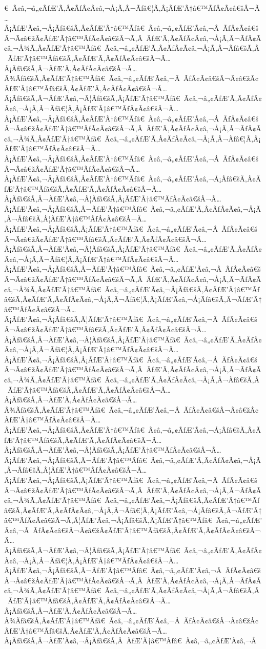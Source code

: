 \documentclass{article}
\begin{document}
\begin{outline}[enumerate]
€ Ã¢â‚¬â„¢ÃƒÆ’Ã‚Â¢ÃƒÂ¢Ã¢â‚¬Å¡Ã‚Â¬Ãƒâ€¦Ã‚Â¡ÃƒÆ’Ã†â€™ÃƒÂ¢Ã¢â€šÂ¬Ã…Â¡ÃƒÆ’Ã¢â‚¬Å¡Ãƒâ€šÃ‚Â¢ÃƒÆ’Ã†â€™Ãƒâ€ Ã¢â‚¬â„¢ÃƒÆ’Ã¢â‚¬Â ÃƒÂ¢Ã¢â€šÂ¬Ã¢â€žÂ¢ÃƒÆ’Ã†â€™ÃƒÂ¢Ã¢â€šÂ¬Ã‚Â ÃƒÆ’Ã‚Â¢ÃƒÂ¢Ã¢â‚¬Å¡Ã‚Â¬ÃƒÂ¢Ã¢â‚¬Å¾Ã‚Â¢ÃƒÆ’Ã†â€™Ãƒâ€ Ã¢â‚¬â„¢ÃƒÆ’Ã‚Â¢ÃƒÂ¢Ã¢â‚¬Å¡Ã‚Â¬Ãƒâ€šÃ‚Â ÃƒÆ’Ã†â€™Ãƒâ€šÃ‚Â¢ÃƒÆ’Ã‚Â¢ÃƒÂ¢Ã¢â€šÂ¬Ã…Â¡Ãƒâ€šÃ‚Â¬ÃƒÆ’Ã‚Â¢ÃƒÂ¢Ã¢â€šÂ¬Ã…Â¾Ãƒâ€šÃ‚Â¢ÃƒÆ’Ã†â€™Ãƒâ€ Ã¢â‚¬â„¢ÃƒÆ’Ã¢â‚¬Â ÃƒÂ¢Ã¢â€šÂ¬Ã¢â€žÂ¢ÃƒÆ’Ã†â€™Ãƒâ€šÃ‚Â¢ÃƒÆ’Ã‚Â¢ÃƒÂ¢Ã¢â€šÂ¬Ã…Â¡Ãƒâ€šÃ‚Â¬ÃƒÆ’Ã¢â‚¬Â¦Ãƒâ€šÃ‚Â¡ÃƒÆ’Ã†â€™Ãƒâ€ Ã¢â‚¬â„¢ÃƒÆ’Ã‚Â¢ÃƒÂ¢Ã¢â‚¬Å¡Ã‚Â¬Ãƒâ€¦Ã‚Â¡ÃƒÆ’Ã†â€™ÃƒÂ¢Ã¢â€šÂ¬Ã…Â¡ÃƒÆ’Ã¢â‚¬Å¡Ãƒâ€šÃ‚Â¢ÃƒÆ’Ã†â€™Ãƒâ€ Ã¢â‚¬â„¢ÃƒÆ’Ã¢â‚¬Â ÃƒÂ¢Ã¢â€šÂ¬Ã¢â€žÂ¢ÃƒÆ’Ã†â€™ÃƒÂ¢Ã¢â€šÂ¬Ã‚Â ÃƒÆ’Ã‚Â¢ÃƒÂ¢Ã¢â‚¬Å¡Ã‚Â¬ÃƒÂ¢Ã¢â‚¬Å¾Ã‚Â¢ÃƒÆ’Ã†â€™Ãƒâ€ Ã¢â‚¬â„¢ÃƒÆ’Ã‚Â¢ÃƒÂ¢Ã¢â‚¬Å¡Ã‚Â¬Ãƒâ€¦Ã‚Â¡ÃƒÆ’Ã†â€™ÃƒÂ¢Ã¢â€šÂ¬Ã…Â¡ÃƒÆ’Ã¢â‚¬Å¡Ãƒâ€šÃ‚Â¢ÃƒÆ’Ã†â€™Ãƒâ€ Ã¢â‚¬â„¢ÃƒÆ’Ã¢â‚¬Â ÃƒÂ¢Ã¢â€šÂ¬Ã¢â€žÂ¢ÃƒÆ’Ã†â€™ÃƒÂ¢Ã¢â€šÂ¬Ã…Â¡ÃƒÆ’Ã¢â‚¬Å¡Ãƒâ€šÃ‚Â¢ÃƒÆ’Ã†â€™Ãƒâ€ Ã¢â‚¬â„¢ÃƒÆ’Ã¢â‚¬Å¡Ãƒâ€šÃ‚Â¢ÃƒÆ’Ã†â€™Ãƒâ€šÃ‚Â¢ÃƒÆ’Ã‚Â¢ÃƒÂ¢Ã¢â€šÂ¬Ã…Â¡Ãƒâ€šÃ‚Â¬ÃƒÆ’Ã¢â‚¬Â¦Ãƒâ€šÃ‚Â¡ÃƒÆ’Ã†â€™ÃƒÂ¢Ã¢â€šÂ¬Ã…Â¡ÃƒÆ’Ã¢â‚¬Å¡Ãƒâ€šÃ‚Â¬ÃƒÆ’Ã†â€™Ãƒâ€ Ã¢â‚¬â„¢ÃƒÆ’Ã‚Â¢ÃƒÂ¢Ã¢â‚¬Å¡Ã‚Â¬Ãƒâ€šÃ‚Â¦ÃƒÆ’Ã†â€™ÃƒÂ¢Ã¢â€šÂ¬Ã…Â¡ÃƒÆ’Ã¢â‚¬Å¡Ãƒâ€šÃ‚Â¡ÃƒÆ’Ã†â€™Ãƒâ€ Ã¢â‚¬â„¢ÃƒÆ’Ã¢â‚¬Â ÃƒÂ¢Ã¢â€šÂ¬Ã¢â€žÂ¢ÃƒÆ’Ã†â€™Ãƒâ€šÃ‚Â¢ÃƒÆ’Ã‚Â¢ÃƒÂ¢Ã¢â€šÂ¬Ã…Â¡Ãƒâ€šÃ‚Â¬ÃƒÆ’Ã¢â‚¬Â¦Ãƒâ€šÃ‚Â¡ÃƒÆ’Ã†â€™Ãƒâ€ Ã¢â‚¬â„¢ÃƒÆ’Ã‚Â¢ÃƒÂ¢Ã¢â‚¬Å¡Ã‚Â¬Ãƒâ€¦Ã‚Â¡ÃƒÆ’Ã†â€™ÃƒÂ¢Ã¢â€šÂ¬Ã…Â¡ÃƒÆ’Ã¢â‚¬Å¡Ãƒâ€šÃ‚Â¬ÃƒÆ’Ã†â€™Ãƒâ€ Ã¢â‚¬â„¢ÃƒÆ’Ã¢â‚¬Â ÃƒÂ¢Ã¢â€šÂ¬Ã¢â€žÂ¢ÃƒÆ’Ã†â€™ÃƒÂ¢Ã¢â€šÂ¬Ã‚Â ÃƒÆ’Ã‚Â¢ÃƒÂ¢Ã¢â‚¬Å¡Ã‚Â¬ÃƒÂ¢Ã¢â‚¬Å¾Ã‚Â¢ÃƒÆ’Ã†â€™Ãƒâ€ Ã¢â‚¬â„¢ÃƒÆ’Ã¢â‚¬Å¡Ãƒâ€šÃ‚Â¢ÃƒÆ’Ã†â€™Ãƒâ€šÃ‚Â¢ÃƒÆ’Ã‚Â¢ÃƒÂ¢Ã¢â‚¬Å¡Ã‚Â¬Ãƒâ€¦Ã‚Â¡ÃƒÆ’Ã¢â‚¬Å¡Ãƒâ€šÃ‚Â¬ÃƒÆ’Ã†â€™ÃƒÂ¢Ã¢â€šÂ¬Ã…Â¡ÃƒÆ’Ã¢â‚¬Å¡Ãƒâ€šÃ‚Â¦ÃƒÆ’Ã†â€™Ãƒâ€ Ã¢â‚¬â„¢ÃƒÆ’Ã¢â‚¬Â ÃƒÂ¢Ã¢â€šÂ¬Ã¢â€žÂ¢ÃƒÆ’Ã†â€™Ãƒâ€šÃ‚Â¢ÃƒÆ’Ã‚Â¢ÃƒÂ¢Ã¢â€šÂ¬Ã…Â¡Ãƒâ€šÃ‚Â¬ÃƒÆ’Ã¢â‚¬Â¦Ãƒâ€šÃ‚Â¡ÃƒÆ’Ã†â€™Ãƒâ€ Ã¢â‚¬â„¢ÃƒÆ’Ã‚Â¢ÃƒÂ¢Ã¢â‚¬Å¡Ã‚Â¬Ãƒâ€¦Ã‚Â¡ÃƒÆ’Ã†â€™ÃƒÂ¢Ã¢â€šÂ¬Ã…Â¡ÃƒÆ’Ã¢â‚¬Å¡Ãƒâ€šÃ‚Â¡ÃƒÆ’Ã†â€™Ãƒâ€ Ã¢â‚¬â„¢ÃƒÆ’Ã¢â‚¬Â ÃƒÂ¢Ã¢â€šÂ¬Ã¢â€žÂ¢ÃƒÆ’Ã†â€™ÃƒÂ¢Ã¢â€šÂ¬Ã‚Â ÃƒÆ’Ã‚Â¢ÃƒÂ¢Ã¢â‚¬Å¡Ã‚Â¬ÃƒÂ¢Ã¢â‚¬Å¾Ã‚Â¢ÃƒÆ’Ã†â€™Ãƒâ€ Ã¢â‚¬â„¢ÃƒÆ’Ã‚Â¢ÃƒÂ¢Ã¢â‚¬Å¡Ã‚Â¬Ãƒâ€šÃ‚Â ÃƒÆ’Ã†â€™Ãƒâ€šÃ‚Â¢ÃƒÆ’Ã‚Â¢ÃƒÂ¢Ã¢â€šÂ¬Ã…Â¡Ãƒâ€šÃ‚Â¬ÃƒÆ’Ã‚Â¢ÃƒÂ¢Ã¢â€šÂ¬Ã…Â¾Ãƒâ€šÃ‚Â¢ÃƒÆ’Ã†â€™Ãƒâ€ Ã¢â‚¬â„¢ÃƒÆ’Ã¢â‚¬Â ÃƒÂ¢Ã¢â€šÂ¬Ã¢â€žÂ¢ÃƒÆ’Ã†â€™ÃƒÂ¢Ã¢â€šÂ¬Ã…Â¡ÃƒÆ’Ã¢â‚¬Å¡Ãƒâ€šÃ‚Â¢ÃƒÆ’Ã†â€™Ãƒâ€ Ã¢â‚¬â„¢ÃƒÆ’Ã¢â‚¬Å¡Ãƒâ€šÃ‚Â¢ÃƒÆ’Ã†â€™Ãƒâ€šÃ‚Â¢ÃƒÆ’Ã‚Â¢ÃƒÂ¢Ã¢â€šÂ¬Ã…Â¡Ãƒâ€šÃ‚Â¬ÃƒÆ’Ã¢â‚¬Â¦Ãƒâ€šÃ‚Â¡ÃƒÆ’Ã†â€™ÃƒÂ¢Ã¢â€šÂ¬Ã…Â¡ÃƒÆ’Ã¢â‚¬Å¡Ãƒâ€šÃ‚Â¬ÃƒÆ’Ã†â€™Ãƒâ€ Ã¢â‚¬â„¢ÃƒÆ’Ã‚Â¢ÃƒÂ¢Ã¢â‚¬Å¡Ã‚Â¬Ãƒâ€šÃ‚Â¦ÃƒÆ’Ã†â€™ÃƒÂ¢Ã¢â€šÂ¬Ã…Â¡ÃƒÆ’Ã¢â‚¬Å¡Ãƒâ€šÃ‚Â¡ÃƒÆ’Ã†â€™Ãƒâ€ Ã¢â‚¬â„¢ÃƒÆ’Ã¢â‚¬Â ÃƒÂ¢Ã¢â€šÂ¬Ã¢â€žÂ¢ÃƒÆ’Ã†â€™ÃƒÂ¢Ã¢â€šÂ¬Ã‚Â ÃƒÆ’Ã‚Â¢ÃƒÂ¢Ã¢â‚¬Å¡Ã‚Â¬ÃƒÂ¢Ã¢â‚¬Å¾Ã‚Â¢ÃƒÆ’Ã†â€™Ãƒâ€ Ã¢â‚¬â„¢ÃƒÆ’Ã¢â‚¬Å¡Ãƒâ€šÃ‚Â¢ÃƒÆ’Ã†â€™Ãƒâ€šÃ‚Â¢ÃƒÆ’Ã‚Â¢ÃƒÂ¢Ã¢â‚¬Å¡Ã‚Â¬Ãƒâ€¦Ã‚Â¡ÃƒÆ’Ã¢â‚¬Å¡Ãƒâ€šÃ‚Â¬ÃƒÆ’Ã†â€™ÃƒÂ¢Ã¢â€šÂ¬Ã‚Â¦ÃƒÆ’Ã¢â‚¬Å¡Ãƒâ€šÃ‚Â¡ÃƒÆ’Ã†â€™Ãƒâ€ Ã¢â‚¬â„¢ÃƒÆ’Ã¢â‚¬Â ÃƒÂ¢Ã¢â€šÂ¬Ã¢â€žÂ¢ÃƒÆ’Ã†â€™Ãƒâ€šÃ‚Â¢ÃƒÆ’Ã‚Â¢ÃƒÂ¢Ã¢â€šÂ¬Ã…Â¡Ãƒâ€šÃ‚Â¬ÃƒÆ’Ã¢â‚¬Â¦Ãƒâ€šÃ‚Â¡ÃƒÆ’Ã†â€™Ãƒâ€ Ã¢â‚¬â„¢ÃƒÆ’Ã‚Â¢ÃƒÂ¢Ã¢â‚¬Å¡Ã‚Â¬Ãƒâ€¦Ã‚Â¡ÃƒÆ’Ã†â€™ÃƒÂ¢Ã¢â€šÂ¬Ã…Â¡ÃƒÆ’Ã¢â‚¬Å¡Ãƒâ€šÃ‚Â¬ÃƒÆ’Ã†â€™Ãƒâ€ Ã¢â‚¬â„¢ÃƒÆ’Ã¢â‚¬Â ÃƒÂ¢Ã¢â€šÂ¬Ã¢â€žÂ¢ÃƒÆ’Ã†â€™ÃƒÂ¢Ã¢â€šÂ¬Ã‚Â ÃƒÆ’Ã‚Â¢ÃƒÂ¢Ã¢â‚¬Å¡Ã‚Â¬ÃƒÂ¢Ã¢â‚¬Å¾Ã‚Â¢ÃƒÆ’Ã†â€™Ãƒâ€ Ã¢â‚¬â„¢ÃƒÆ’Ã‚Â¢ÃƒÂ¢Ã¢â‚¬Å¡Ã‚Â¬Ãƒâ€šÃ‚Â ÃƒÆ’Ã†â€™Ãƒâ€šÃ‚Â¢ÃƒÆ’Ã‚Â¢ÃƒÂ¢Ã¢â€šÂ¬Ã…Â¡Ãƒâ€šÃ‚Â¬ÃƒÆ’Ã‚Â¢ÃƒÂ¢Ã¢â€šÂ¬Ã…Â¾Ãƒâ€šÃ‚Â¢ÃƒÆ’Ã†â€™Ãƒâ€ Ã¢â‚¬â„¢ÃƒÆ’Ã¢â‚¬Â ÃƒÂ¢Ã¢â€šÂ¬Ã¢â€žÂ¢ÃƒÆ’Ã†â€™Ãƒâ€šÃ‚Â¢ÃƒÆ’Ã‚Â¢ÃƒÂ¢Ã¢â€šÂ¬Ã…Â¡Ãƒâ€šÃ‚Â¬ÃƒÆ’Ã¢â‚¬Å¡Ãƒâ€šÃ‚Â ÃƒÆ’Ã†â€™Ãƒâ€ Ã¢â‚¬â„¢ÃƒÆ’Ã¢â‚¬Å
\end{outline}
\end{document}
